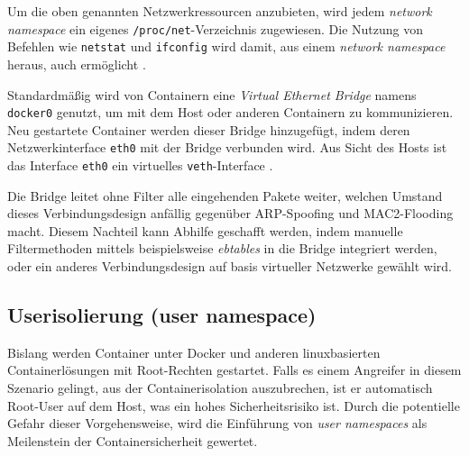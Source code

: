 \documentclass[../main.tex]{subfiles}
\begin{document}
			Um die oben genannten Netzwerkressourcen anzubieten, wird jedem \emph{network namespace} ein eigenes \texttt{/proc/net}-Verzeichnis zugewiesen. Die Nutzung von Befehlen wie \texttt{netstat} und \texttt{ifconfig} wird damit, aus einem \emph{network namespace} heraus, auch ermöglicht \cite[S.7]{IBMcheckpointRestart}.

			Standardmäßig wird von Containern eine \emph{Virtual Ethernet Bridge} namens \texttt{docker0} genutzt, um mit dem Host oder anderen Containern zu kommunizieren. Neu gestartete Container werden dieser Bridge hinzugefügt, indem deren Netzwerkinterface \texttt{eth0} mit der Bridge verbunden wird. Aus Sicht des Hosts ist das Interface \texttt{eth0} ein virtuelles \texttt{veth}-Interface \cite[S.3]{virtVSContainer}.

			Die Bridge leitet ohne Filter alle eingehenden Pakete weiter, welchen Umstand dieses Verbindungsdesign anfällig gegenüber \acrshort{ARP}-Spoofing und \acrshort{MAC2}-Flooding macht. Diesem Nachteil kann Abhilfe geschafft werden, indem manuelle Filtermethoden mittels beispielsweise \emph{ebtables} in die Bridge integriert werden, oder ein anderes Verbindungsdesign auf basis virtueller Netzwerke gewählt wird.



			\cite[S.4]{dockerSec1}


    \subsection{Userisolierung (user namespace)}
			Bislang werden Container unter Docker und anderen linuxbasierten Containerlösungen mit Root-Rechten gestartet. Falls es einem Angreifer in diesem Szenario gelingt, aus der Containerisolation auszubrechen, ist er automatisch Root-User auf dem Host, was ein hohes Sicherheitsrisiko ist. Durch die potentielle Gefahr dieser Vorgehensweise, wird die Einführung von \emph{user namespaces} als Meilenstein der Containersicherheit gewertet.
\end{document}
